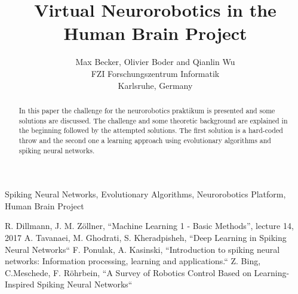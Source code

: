 \documentclass[conference]{IEEEtran}
\begin{document}
\title{Virtual Neurorobotics in the Human Brain Project}
\author{Max Becker, Olivier Boder and Qianlin Wu\\FZI Forschungszentrum Informatik\\Karlsruhe, Germany}

\maketitle
\thispagestyle{plain}
\pagestyle{plain}

\begin{abstract}
In this paper the challenge for the neurorobotics praktikum is presented and some solutions are discussed.
The challenge and some theoretic background are explained in the beginning followed by the attempted solutions.
The first solution is a hard-coded throw and the second one a learning approach using evolutionary algorithms and spiking neural networks.
\end{abstract}


\begin{IEEEkeywords}
Spiking Neural Networks, Evolutionary Algorithms, Neurorobotics Platform, Human Brain Project
\end{IEEEkeywords}












\begin{thebibliography}{00}
 R. Dillmann, J. M. Z{\"o}llner, ``Machine Learning 1 - Basic Methods'', lecture 14, 2017
 A. Tavanaei, M. Ghodrati, S. Kheradpisheh, ``Deep Learning in Spiking Neural Networks``
 F. Ponulak, A. Kasinski, ``Introduction to spiking neural networks: Information processing, learning and applications.``
 Z. Bing, C.Meschede, F. R{\"o}hrbein, ``A Survey of Robotics Control Based on Learning-Inspired Spiking Neural Networks``
\end{thebibliography}
\end{document}
